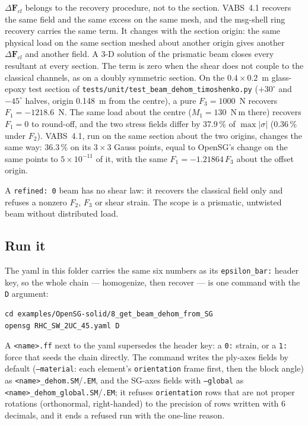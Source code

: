 $\Delta\mathbf{F}_{cl}$ belongs to the recovery procedure, not to the section.
VABS~4.1 recovers the same field and the same excess on the same mesh, and the
msg-shell ring recovery carries the same term. It changes with the section
origin: the same physical load on the same section meshed about another origin
gives another $\Delta\mathbf{F}_{cl}$ and another field. A 3-D solution of the
prismatic beam closes every resultant at every section. The term is zero when
the shear does not couple to the classical channels, as on a doubly symmetric
section. On the $0.4\times0.2$~m glass-epoxy test section of
\texttt{tests/unit/test\_beam\_dehom\_timoshenko.py} ($+30^\circ$ and
$-45^\circ$ halves, origin 0.148~m from the centre), a pure $F_3 = 1000$~N
recovers $F_1 = -1218.6$~N. The same load about the centre ($M_1 = 130$~N\,m
there) recovers $F_1 = 0$ to round-off, and the two stress fields differ by
37.9\,\% of $\max|\sigma|$ (0.36\,\% under $F_2$). VABS~4.1, run on the same
section about the two origins, changes the same way: 36.3\,\% on its
$3\times3$ Gauss points, equal to OpenSG's change on the same points to
$5\times10^{-11}$ of it, with the same $F_1 = -1.21864\,F_3$ about the offset
origin.

A \texttt{refined: 0} beam has no
shear law: it recovers the classical field only and refuses a nonzero $F_2$,
$F_3$ or shear strain. The scope is a prismatic, untwisted beam without
distributed load.

\subsection{Run it}

The yaml in this folder carries the same six numbers as its
\texttt{epsilon\_bar:} header key, so the whole chain --- homogenize, then
recover --- is one command with the \texttt{D} argument:

\begin{lstlisting}[style=shellst]
cd examples/OpenSG-solid/8_get_beam_dehom_from_SG
opensg RHC_SW_2UC_45.yaml D
\end{lstlisting}

A \texttt{<name>.ff} next to the yaml supersedes the header key: a \texttt{0:}
strain, or a \texttt{1:} force that seeds the chain directly. The command
writes the ply-axes fields by default (\texttt{--material}: each element's
\texttt{orientation} frame first, then the block angle) as
\texttt{<name>\_dehom.SM}/\texttt{.EM}, and the SG-axes fields with
\texttt{--global} as \texttt{<name>\_dehom\_global.SM}/\texttt{.EM}; it refuses
\texttt{orientation} rows that are not proper rotations (orthonormal,
right-handed) to the precision of rows written with 6 decimals, and it ends a
refused run with the one-line reason.

